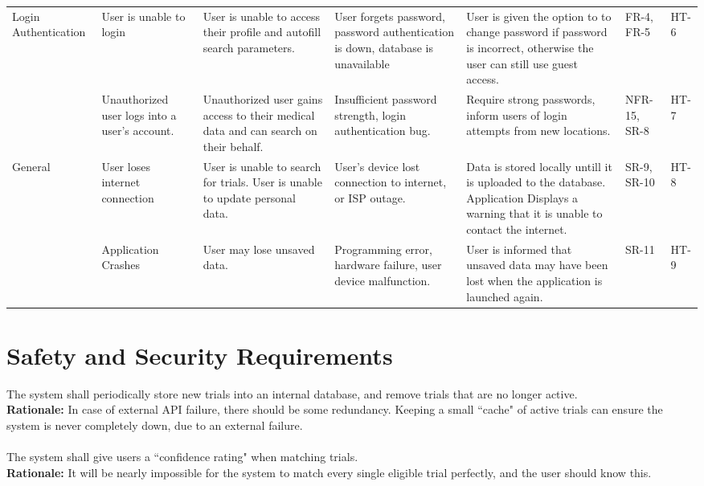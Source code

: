 \documentclass{article}
\begin{document}
\begin{table}[H]
{\begin{tabular}{|p{3cm}|p{3cm}p{3cm}p{3cm}p{3cm}p{3cm}p{3cm}|}
    \hline
  Login Authentication  & User is unable to login & User is unable to access their profile and autofill search parameters. & User forgets password, password authentication is down, database is unavailable & User is given the option to to change password if password is incorrect, otherwise the user can still use guest access. & FR-4, FR-5 & HT-6 \\\cline{2-7}
  & Unauthorized user logs into a user's account. & Unauthorized user gains access to their medical data and can search on their behalf. & Insufficient password strength, login authentication bug. & Require strong passwords, inform users of login attempts from new locations. & NFR-15, SR-8 & HT-7 \\
    \hline
  General  & User loses internet connection & User is unable to search for trials. User is unable to update personal data. & User's device lost connection to internet, or ISP outage.& Data is stored locally untill it is uploaded to the database. Application Displays a warning that it is unable to contact the internet. &  SR-9, SR-10 & HT-8 \\\cline{2-7}
  & Application Crashes & User may lose unsaved data. & Programming error, hardware failure, user device malfunction. & User is informed that unsaved data may have been lost when the application is launched again. &  SR-11 & HT-9 \\
    \hline
    \end{tabular}}
\end{table}


\section{Safety and Security Requirements}

The system shall periodically store new trials into an internal database, and remove trials that are no longer active.\\
\textbf{Rationale:} 
In case of external API failure, there should be some redundancy. Keeping a small ``cache" of active trials can ensure the system is never
completely down, due to an external failure.\\~\\

The system shall give users a ``confidence rating" when matching trials.\\
\textbf{Rationale:} 
It will be nearly impossible for the system to match every single eligible trial perfectly, and the user should know this.\\~\\
\end{document}
